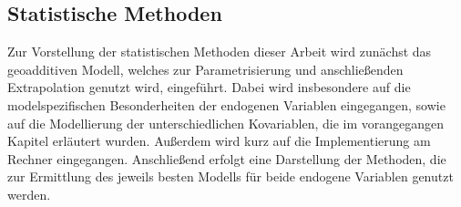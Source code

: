 \documentclass{Vorlage}
\begin{document}
\begin{table}[h]
\centering
\caption{Sozioökonomische und geographische Variablen der Gebäude- und Wohnungszählung im Rahmen des Zensus und deren Anzahl der Ausprägungen.}
\label{Var_Zensus}
\end{table}

\newpage

\subsection{Statistische Methoden}

Zur Vorstellung der statistischen Methoden dieser Arbeit wird zunächst das geoadditiven Modell, welches zur Parametrisierung und anschließenden Extrapolation genutzt wird, eingeführt. Dabei wird insbesondere auf die modelspezifischen Besonderheiten der endogenen Variablen eingegangen, sowie auf die Modellierung der unterschiedlichen Kovariablen, die im vorangegangen Kapitel erläutert wurden. Außerdem wird kurz auf die Implementierung am Rechner eingegangen. Anschließend erfolgt eine Darstellung der Methoden, die zur Ermittlung des jeweils besten Modells für beide endogene Variablen genutzt werden.
\end{document}
